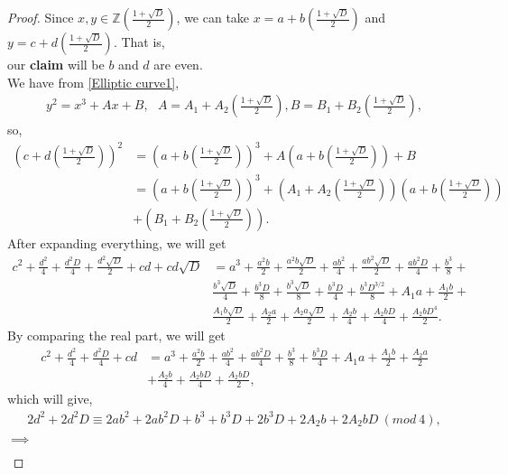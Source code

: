 \documentclass[10pt,a4paper]{amsart}
\begin{document}
\begin{proof}
    Since $x,y\in \mathbb Z(\frac{1+\sqrt{D}}{2})$, we can take $x=a+b(\frac{1+\sqrt{D}}{2})$ and $y=c+d(\frac{1+\sqrt{D}}{2})$. That is,\\
    our \textbf{claim} will be $b$ and $d$ are even.\\
    We have from \eqref{Elliptic curve1},\\
    \begin{align*}
        y^2=x^3+Ax+B,~~~A=A_1+A_2\left(\frac{1+\sqrt{D}}{2}\right), B=B_1+B_2\left(\frac{1+\sqrt{D}}{2}\right),
    \end{align*}
    so,
    \begin{align*}
        \left(c+d(\frac{1+\sqrt{D}}{2})\right)^2&=\left(a+b\left(\frac{1+\sqrt{D}}{2}\right)\right)^3+A\left(a+b(\frac{1+\sqrt{D}}{2})\right)+B\\
        &=\left(a+b\left(\frac{1+\sqrt{D}}{2}\right)\right)^3+\left(A_1+A_2(\frac{1+\sqrt{D}}{2})\right)\left(a+b\left(\frac{1+\sqrt{D}}{2}\right)\right)\\&+\left(B_1+B_2\left(\frac{1+\sqrt{D}}{2}\right)\right).
    \end{align*}
    After expanding everything, we will get\\
    \begin{align*}
        c^2+\frac{d^2}{4}+\frac{d^2D}{4}+\frac{d^2\sqrt{D}}{2}+cd+cd\sqrt{D}&=a^3+\frac{a^2b}{2}+\frac{a^2b\sqrt{D}}{2}+\frac{ab^2}{4}+\frac{ab^2\sqrt{D}}{2}+\frac{ab^2D}{4}+\frac{b^3}{8}+\\&\frac{b^3\sqrt{D}}{4}+\frac{b^3D}{8}+\frac{b^3\sqrt{D}}{8}+\frac{b^3D}{4}+\frac{b^3D^{3/2}}{8}+A_1a+\frac{A_1b}{2}+\\&\frac{A_1b\sqrt{D}}{2}+\frac{A_2a}{2}+\frac{A_2a\sqrt{D}}{2}+\frac{A_2b}{4}+\frac{A_2bD}{4}+\frac{A_2bD^4}{2}.
    \end{align*}
    By comparing the real part, we will get
    \begin{align*}
        c^2+\frac{d^2}{4}+\frac{d^2D}{4}+cd&=a^3+\frac{a^2b}{2}+\frac{ab^2}{4}+\frac{ab^2D}{4}+\frac{b^3}{8}+\frac{b^3D}{4}+A_1a+\frac{A
        _1b}{2}+\frac{A_2a}{2}\\&+\frac{A_2b}{4}+\frac{A_2bD}{4}+\frac{A_2bD}{2},
    \end{align*}
    which will give,\\
    \begin{align*}
        2d^2+2d^2D\equiv 2ab^2+2ab^2D+b^3+b^3D+2b^3D+2A_2b+2A_2bD~(mod~4),
    \end{align*}
    $\implies$
    \begin{align*}

\end{align*}
\end{proof}
\end{document}
